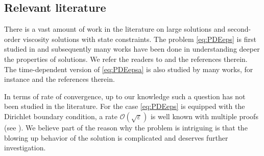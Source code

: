 \documentclass[12pt,reqno]{amsart}
\numberwithin{figure}{section}
\theoremstyle{plain}
\theoremstyle{remark}
\numberwithin{equation}{section}
\begin{document}

\subsection{Relevant literature} There is a
vast amount of work in the literature on large solutions and second-order viscosity solutions with state constraints. The problem \eqref{eq:PDEeps} is first studied in \cite{Lasry1989} and subsequently many works have been done in understanding deeper the properties of solutions. %
We refer the readers to \cite{ Porretta_a,alessio_asymptotic_2006,Bandle_1994, marcus_existence_2003} and the references therein. The time-dependent version of \eqref{eq:PDEepsa} is also studied by many works, for instance \cite{barles_generalized_2004,barles_large_2010,leonori_local_2011,moll_large_2012} and the references therein.

In terms of rate of convergence, up to our knowledge such a question has not been studied in the literature. For the case \eqref{eq:PDEeps} is equipped with the Dirichlet boundary condition, a rate $\mathcal{O}(\sqrt{\varepsilon})$ is well known with multiple proofs (see \cite{Bardi1997,crandall1984, tran_hamilton-jacobi_2021}). We believe part of the reason why the problem is intriguing is that the blowing up behavior of the solution is complicated and deserves further investigation.
\end{document}
